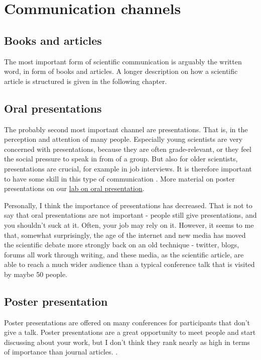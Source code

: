 \documentclass{tufte-book}
\begin{document}
\section{Communication channels}

\subsection{Books and articles}

The most important form of scientific communication is arguably the written word, in form of books and articles. A longer description on how a scientific article is structured is given in the following chapter. 

\subsection{Oral presentations}

The probably second most important channel are presentations. That is, in the perception and attention of many people. Especially young scientists are very concerned with presentations, because they are often grade-relevant, or they feel the social pressure to speak in from of a group. But also for older scientists, presentations are crucial, for example in job interviews. It is therefore important to have some skill in this type of communication \citep[see, e.g. the tips of][]{Kelleher-Tenguidelineseffective-2011}. More material on poster presentations on our \href{https://github.com/florianhartig/ResearchSkills/tree/master/Labs/OralPresentation}{lab on oral presentation}. 

Personally, I think the importance of presentations has decreased. That is not to say that oral presentations are not important - people still give presentations, and you shouldn't suck at it. Often, your job may rely on it. However, it seems to me that, somewhat surprisingly, the age of the internet and new media has moved the scientific debate more strongly back on an old technique - twitter, blogs, forums all work through writing, and these media, as the scientific article, are able to reach a much wider audience than a typical conference talk that is visited by maybe 50 people. 

\subsection{Poster presentation}

Poster presentations are offered on many conferences for participants that don't give a talk. Poster presentations are a great opportunity to meet people and start discussing about your work, but I don't think they rank nearly as high in terms of importance than journal articles. . 
\end{document}
